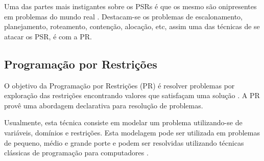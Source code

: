 \documentclass[12pt]{article}
\newcommand{\PR}{Programação por Restrições}
\theoremstyle{definition}
\begin{document}
\begin{comment}
A \PR por sua vez, a exemplo da IA, CE, PO, etc, apresenta várias outras
subdivisões e sub-áreas de interesse.  Uma delas ela é a \textit{Programação em Lógica com Restrições} \cite{Marriot_98} um dos segmentos a serem atacados nesta pesquisa. A PLR tem na lógica de primeira-ordem 
o seu modelo computacional, o qual é calculado a partir de buscas exaustivas sobre
os seus \textit{modelos consistentes} -- modelos de Herbrand.
\end{comment}

Uma das   partes mais instigantes sobre os PSRs é que os mesmo são onipresentes
em problemas do mundo real \cite{rossi2006}. Destacam-se os problemas de escalonamento, planejamento, roteamento, contenção, alocação, etc, assim  uma das técnicas de se atacar os PSR, é  com a PR.

\begin{comment}
As restrições podem ser consideradas como informações e dados há um programa por restrições. 
Estas  visam limitar o \textit{espaço de busca} e descrevem propriedades de 
variáveis/objetos e o relacionamento entre eles. As restrições são formalizadas como uma relação entre os objetos e esses são modelados como variáveis \cite{BARTAK98c}.
\end{comment}
\begin{comment}
A relação existente entre os problemas de satisfação de restrições e a programação por restrições é expressa pela figura \ref{fig:eureka}. Portanto, pode-se considerar que a PR está contida em PSR. Ou seja, a PR é um método que pode ser aplicado para encontrar a solução de problemas do tipo PSR.
\end{comment}


\subsection{Programação por Restrições}

O objetivo da Programação por Restrições (PR) é resolver problemas por exploração das restrições encontrando valores que satisfaçam uma solução \cite{apt_2003}. A PR provê  uma abordagem declarativa para resolução de problemas.

Usualmente, esta técnica consiste em modelar um problema utilizando-se de variáveis, domínios e restrições. Esta modelagem pode ser utilizada em problemas de pequeno, médio e grande porte e podem ser resolvidas utilizando técnicas clássicas de programação para computadores \cite{BARTAK07}.
\end{document}
